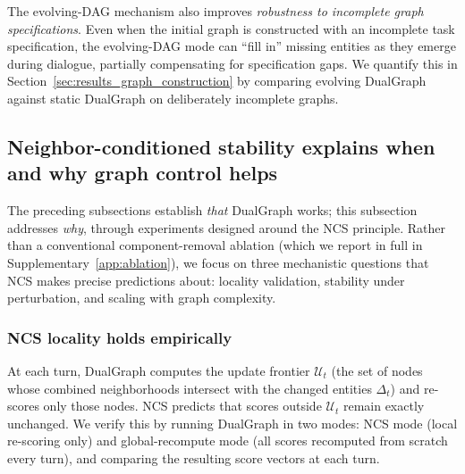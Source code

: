 \documentclass[11pt,a4paper]{article}
\begin{document}
The evolving-DAG mechanism also improves \emph{robustness to incomplete graph
specifications}. Even when the initial graph is constructed with an incomplete
task specification, the evolving-DAG mode can ``fill in'' missing entities as
they emerge during dialogue, partially compensating for specification gaps.
We quantify this in Section~\ref{sec:results_graph_construction} by
comparing evolving DualGraph against static DualGraph on deliberately
incomplete graphs.


\subsection{Neighbor-conditioned stability explains when and why graph control
helps}
\label{sec:results_mechanism}

The preceding subsections establish \emph{that} DualGraph works; this
subsection addresses \emph{why}, through experiments designed around the
NCS principle. Rather than a conventional component-removal ablation (which
we report in full in Supplementary~\ref{app:ablation}), we focus on three
mechanistic questions that NCS makes precise predictions about: locality
validation, stability under perturbation, and scaling with graph complexity.

\subsubsection{NCS locality holds empirically}
\label{sec:results_ncs_locality}

At each turn, DualGraph computes the update frontier $\mathcal{U}_t$ (the
set of nodes whose combined neighborhoods intersect with the changed
entities $\Delta_t$) and re-scores only those nodes. NCS predicts that
scores outside $\mathcal{U}_t$ remain exactly unchanged. We verify this by
running DualGraph in two modes: NCS mode (local re-scoring only) and
global-recompute mode (all scores recomputed from scratch every turn), and
comparing the resulting score vectors at each turn.
\end{document}
